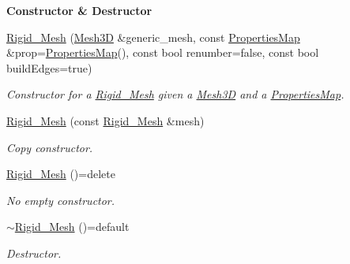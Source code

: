 \begin{Indent}{\bf Constructor \& Destructor}\par
\begin{DoxyCompactItemize}
\item 
\hyperlink{classFVCode3D_1_1Rigid__Mesh_a711f71a2f30f71f108264dee2be9a09a}{Rigid\+\_\+\+Mesh} (\hyperlink{classFVCode3D_1_1Mesh3D}{Mesh3D} \&generic\+\_\+mesh, const \hyperlink{classFVCode3D_1_1PropertiesMap}{Properties\+Map} \&prop=\hyperlink{classFVCode3D_1_1PropertiesMap}{Properties\+Map}(), const bool renumber=false, const bool build\+Edges=true)
\begin{DoxyCompactList}\small\item\em Constructor for a \hyperlink{classFVCode3D_1_1Rigid__Mesh}{Rigid\+\_\+\+Mesh} given a \hyperlink{classFVCode3D_1_1Mesh3D}{Mesh3D} and a \hyperlink{classFVCode3D_1_1PropertiesMap}{Properties\+Map}. \end{DoxyCompactList}\item 
\hyperlink{classFVCode3D_1_1Rigid__Mesh_a46f8ae18ba262a08fb82ea00e3770985}{Rigid\+\_\+\+Mesh} (const \hyperlink{classFVCode3D_1_1Rigid__Mesh}{Rigid\+\_\+\+Mesh} \&mesh)
\begin{DoxyCompactList}\small\item\em Copy constructor. \end{DoxyCompactList}\item 
\hyperlink{classFVCode3D_1_1Rigid__Mesh_a46bc8bc78b842c5cba9bc8f93e68de8a}{Rigid\+\_\+\+Mesh} ()=delete
\begin{DoxyCompactList}\small\item\em No empty constructor. \end{DoxyCompactList}\item 
\hyperlink{classFVCode3D_1_1Rigid__Mesh_ae8f520f38295d72bd580f454612cf7f0}{$\sim$\+Rigid\+\_\+\+Mesh} ()=default
\begin{DoxyCompactList}\small\item\em Destructor. \end{DoxyCompactList}\end{DoxyCompactItemize}
\end{Indent}
